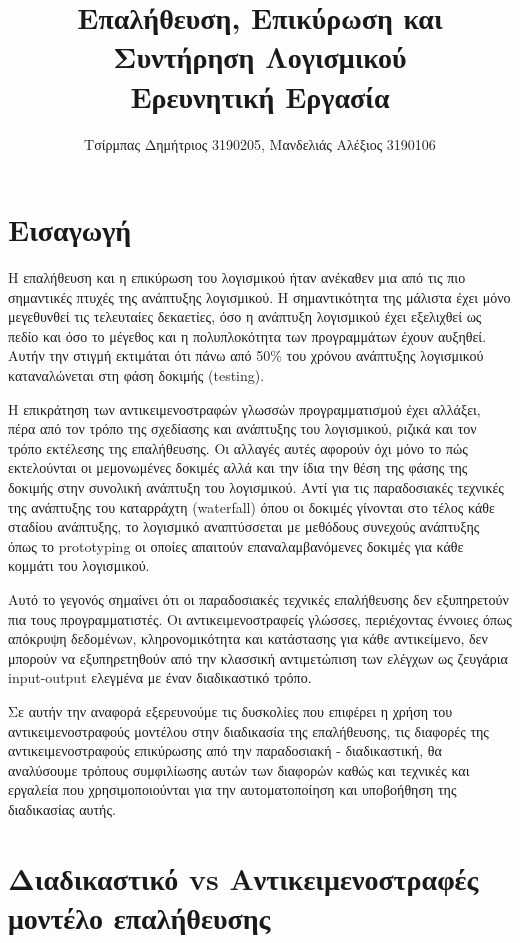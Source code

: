 \documentclass[12pt]{article}
\title{Επαλήθευση, Επικύρωση και Συντήρηση Λογισμικού \\\large Ερευνητική Εργασία}
\author{Τσίρμπας Δημήτριος 3190205, Μανδελιάς Αλέξιος 3190106}
\begin{document}
\maketitle

\section{Εισαγωγή}


Η επαλήθευση και η επικύρωση του λογισμικού ήταν ανέκαθεν μια από τις πιο σημαντικές πτυχές της ανάπτυξης λογισμικού. Η σημαντικότητα της μάλιστα έχει μόνο μεγεθυνθεί τις τελευταίες δεκαετίες, όσο η ανάπτυξη λογισμικού έχει εξελιχθεί ως πεδίο και όσο το μέγεθος και η πολυπλοκότητα των προγραμμάτων έχουν αυξηθεί. Αυτήν την στιγμή εκτιμάται ότι πάνω από 50\% του χρόνου ανάπτυξης λογισμικού καταναλώνεται στη φάση δοκιμής (testing).


\par Η επικράτηση των αντικειμενοστραφών γλωσσών προγραμματισμού έχει αλλάξει, πέρα από τον τρόπο της σχεδίασης και ανάπτυξης του λογισμικού, ριζικά και τον τρόπο εκτέλεσης της επαλήθευσης. Οι αλλαγές αυτές αφορούν όχι μόνο το πώς εκτελούνται οι μεμονωμένες δοκιμές αλλά και την ίδια την θέση της φάσης της δοκιμής στην συνολική ανάπτυξη του λογισμικού. Αντί για τις παραδοσιακές τεχνικές της ανάπτυξης του καταρράχτη (waterfall) όπου οι δοκιμές γίνονται στο τέλος κάθε σταδίου ανάπτυξης, το λογισμικό αναπτύσ\-σεται με μεθόδους συνεχούς ανάπτυξης όπως το prototyping οι οποίες απαιτούν επαναλαμβανόμενες δοκιμές για κάθε κομμάτι του λογισμικού.

\par Αυτό το γεγονός σημαίνει ότι οι παραδοσιακές τεχνικές επαλήθευσης δεν εξυπηρετούν πια τους προγραμματιστές. Οι αντικειμενοστραφείς γλώσσες, περιέχοντας έννοιες όπως απόκρυψη δεδομένων, κληρονομικότητα και κατάστασης για κάθε αντικείμενο, δεν μπορούν να εξυπηρετηθούν από την κλασσική 
αντιμετώπιση των ελέγχων ως ζευγάρια input-output ελεγμένα με έναν διαδικαστικό τρόπο. 

\par Σε αυτήν την αναφορά εξερευνούμε τις δυσκολίες που επιφέρει η χρήση του αντικειμενοστραφούς μοντέλου στην διαδικασία της επαλήθευσης, τις διαφορές της αντικειμενοστραφούς επικύρωσης από την παραδοσιακή - διαδικαστική, θα αναλύσουμε τρόπους συμφιλίωσης αυτών των διαφορών καθώς και τεχνικές και εργαλεία που χρησιμοποιούνται για την αυτοματοποίηση και υποβοήθηση της διαδικασίας αυτής. 

\section{Διαδικαστικό vs Αντικειμενοστραφές μοντέλο επαλήθευσης}
\end{document}
